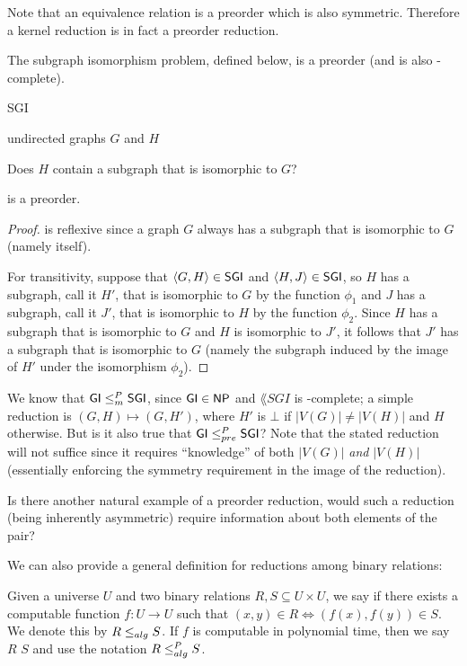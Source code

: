 Note that an equivalence relation is a preorder which is also symmetric.
Therefore a kernel reduction is in fact a preorder reduction.

The subgraph isomorphism problem, defined below, is a preorder (and is also \NP-complete\cite{gj79}).
\begin{langdef}{SGI}
\begin{instance}
  undirected graphs $G$ and $H$
\end{instance}
\begin{question}
  Does $H$ contain a subgraph that is isomorphic to $G$?
\end{question}
\end{langdef}

\begin{proposition}
   is a preorder.
\end{proposition}
\begin{proof}
   is reflexive since a graph $G$ always has a subgraph that is isomorphic to $G$ (namely itself).

  For transitivity, suppose that $\left\langle G,H\right\rangle\in{\ensuremath{\mathsf{SGI}}}$ and $\left\langle H,J\right\rangle\in{\ensuremath{\mathsf{SGI}}}$, so $H$ has a subgraph, call it $H'$, that is isomorphic to $G$ by the function $\phi_1$ and $J$ has a subgraph, call it $J'$, that is isomorphic to $H$ by the function $\phi_2$.
  Since $H$ has a subgraph that is isomorphic to $G$ and $H$ is isomorphic to $J'$, it follows that $J'$ has a subgraph that is isomorphic to $G$ (namely the subgraph induced by the image of $H'$ under the isomorphism $\phi_2$).
\end{proof}

We know that ${\mathsf{GI}}\leq^{P}_{m}{\mathsf{SGI}}$, since ${\mathsf{GI}}\in{\ensuremath{\mathsf{NP}}}$ and $\lang{SGI}$ is \NP-complete; a simple reduction is $(G, H)\mapsto(G, H')$, where $H'$ is $\bot$ if $|V(G)|\neq|V(H)|$ and $H$ otherwise.
But is it also true that ${\mathsf{GI}}\leq^{P}_{pre}{\mathsf{SGI}}$?
Note that the stated reduction will not suffice since it requires ``knowledge'' of both $|V(G)|$ \emph{and} $|V(H)|$ (essentially enforcing the symmetry requirement in the image of the reduction).

Is there another natural example of a preorder reduction, would such a reduction (being inherently asymmetric) require information about both elements of the pair?

We can also provide a general definition for reductions among binary relations:
\begin{definition}
  Given a universe $U$ and two binary relations $R,S\subseteq U\times U$, we say  if there exists a computable function $f\colon U\to U$ such that $(x,y)\in R \iff (f(x), f(y))\in S$.
  We denote this by $R\leq_{alg} S$.
  If $f$ is computable in polynomial time, then we say $R$  $S$ and use the notation $R\leq^{P}_{alg} S$.
\end{definition}
